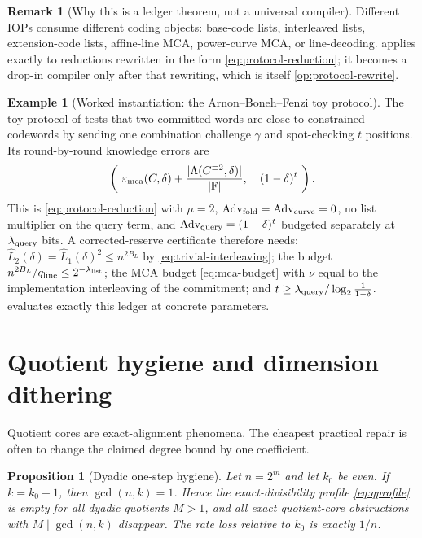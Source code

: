 \documentclass[11pt]{article}
\newtheorem{proposition}[theorem]{Proposition}
\theoremstyle{definition}
\newtheorem{example}[theorem]{Example}
\newtheorem{remark}[theorem]{Remark}
\newcommand{\F}{\mathbb F}
\newcommand{\mca}{\varepsilon_{\rm mca}}
\newcommand{\qline}{q_{\rm line}}
\newcommand{\Adv}{\operatorname{Adv}}
\newcommand{\Int}[2]{#1^{\equiv #2}}
\begin{document}
\begin{remark}[Why this is a ledger theorem, not a universal compiler]
\label{rem:ledger-not-compiler}
Different IOPs consume different coding objects: base-code lists, interleaved lists, extension-code lists, affine-line MCA, power-curve MCA, or line-decoding.   applies exactly to reductions rewritten in the form \eqref{eq:protocol-reduction}; it becomes a drop-in compiler only after that rewriting, which is itself \cref{op:protocol-rewrite}.
\end{remark}

\begin{example}[Worked instantiation: the Arnon--Boneh--Fenzi toy protocol]
\label{ex:toy-ledger}
The toy protocol of \cite{ABF26} tests that two committed words are close to constrained codewords by sending one combination challenge $\gamma$ and spot-checking $t$ positions.  Its round-by-round knowledge errors are
\[
        \left(\ \mca(C,\delta)+\frac{|\Lambda(\Int{C}{2},\delta)|}{|\F|},\quad (1-\delta)^{t}\ \right).
\]
This is \eqref{eq:protocol-reduction} with $\mu=2$, $\Adv_{\rm fold}=\Adv_{\rm curve}=0$, no list multiplier on the query term, and $\Adv_{\rm query}=(1-\delta)^t$ budgeted separately at $\lambda_{\rm query}$ bits.  A corrected-reserve certificate therefore needs: $\widehat L_2(\delta)=\widehat L_1(\delta)^2\le n^{2B_L}$ by \eqref{eq:trivial-interleaving}; the budget $n^{2B_L}/\qline\le2^{-\lambda_{\rm list}}$; the MCA budget \eqref{eq:mca-budget} with $\nu$ equal to the implementation interleaving of the commitment; and $t\ge\lambda_{\rm query}/\log_2\frac1{1-\delta}$.   evaluates exactly this ledger at concrete parameters.
\end{example}

\section{Quotient hygiene and dimension dithering}
\label{sec:hygiene}

Quotient cores are exact-alignment phenomena.  The cheapest practical repair is often to change the claimed degree bound by one coefficient.

\begin{proposition}[Dyadic one-step hygiene]
\label{prop:dyadic-hygiene}
Let $n=2^m$ and let $k_0$ be even.  If $k=k_0-1$, then $\gcd(n,k)=1$.  Hence the exact-divisibility profile \eqref{eq:qprofile} is empty for all dyadic quotients $M>1$, and all exact quotient-core obstructions with $M\mid\gcd(n,k)$ disappear.  The rate loss relative to $k_0$ is exactly $1/n$.
\end{proposition}
\end{document}
